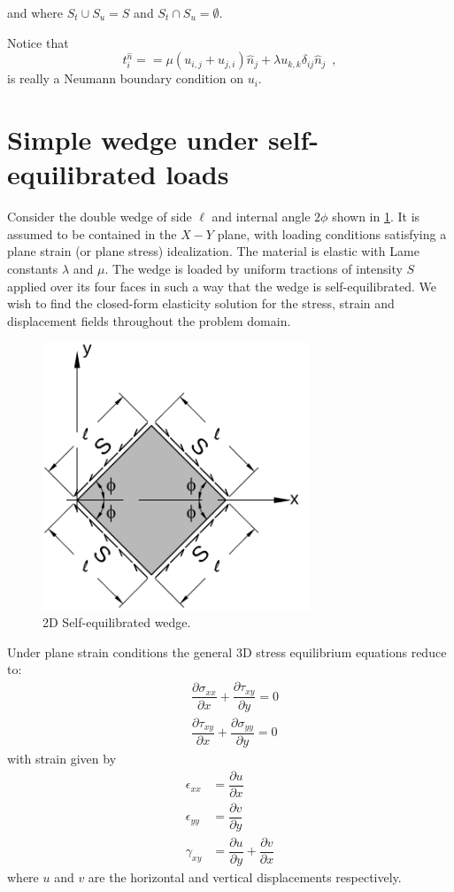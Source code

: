 and where ${S_t} \cup {S_u} = S$ and ${S_t} \cap {S_u} = \emptyset $.  

Notice that
\[t_i^{\hat n} =  = \mu \left( {{u_{i,j}} + {u_{j,i}}} \right){{\hat n}_j} + \lambda {u_{k,k}}{\delta _{ij}}{{\hat n}_j} \enspace ,\]
is really a Neumann boundary condition on $u_i$.

\section*{Simple wedge under self-equilibrated loads}
Consider the double wedge of side $\ell$ and internal angle $2 \phi$ shown in \cref{fig:WEDGE}. It is assumed to be contained in the $X-Y$ plane, with loading conditions satisfying a plane strain (or plane stress) idealization. The material is elastic with Lame constants $\lambda$ and $\mu$. The wedge is loaded by uniform tractions of intensity $S$ applied over its four faces in such a way that the wedge is self-equilibrated. We wish to find the closed-form elasticity solution for the stress, strain and displacement fields throughout the problem domain.
%
\begin{figure}[H]
\centering
\includegraphics[width=8cm]{img_src/wedge.pdf}
\caption{2D Self-equilibrated wedge.}
\label{fig:WEDGE}
\end{figure}

Under plane strain conditions the general 3D stress equilibrium equations reduce to:
\begin{equation}
\begin{aligned}
&\dfrac{\partial\sigma_{xx}}{\partial x}+\dfrac{\partial\tau_{xy}}{\partial y}=0\\
&\dfrac{\partial\tau_{xy}}{\partial x}+\dfrac{\partial\sigma_{yy}}{\partial y}=0
\end{aligned}
\label{eq:equilibrium}
\end{equation}
with strain given by
\begin{equation}
\begin{aligned}
\epsilon_{xx}&=\dfrac{\partial u}{\partial x}\\
\epsilon_{yy}&=\dfrac{\partial v}{\partial y}\\
\gamma_{xy}&=\dfrac{\partial u}{\partial y} + \dfrac{\partial v}{\partial x}
\end{aligned}
\label{eq:strain}
\end{equation}
where $u$ and $v$ are the horizontal and vertical displacements respectively.


